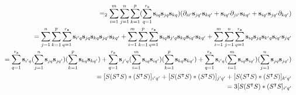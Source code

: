 \documentclass{article}
\begin{document}
\begin{eqnarray*}
    \lefteqn{}
    & & =_2 \sum_{i=1}^m\sum_{j=1}^n\sum_{k=1}^p(\sum_{q=1}^{r_\mathbf{s}}\mathbf{s}_{iq}\mathbf{s}_{jq}\mathbf{s}_{kq})(\partial_{ii'} \mathbf{s}_{jq'}\mathbf{s}_{kq'} + \mathbf{s}_{iq'}\partial_{ji'} \mathbf{s}_{kq'} + \mathbf{s}_{iq'}\mathbf{s}_{jq'}\partial_{kq'}) \\
    & & = \sum_{j=1}^n\sum_{k=1}^p\sum_{q=1}^{r_\mathbf{s}}\mathbf{s}_{i'q}\mathbf{s}_{jq}\mathbf{s}_{kq}\mathbf{s}_{jq'}\mathbf{s}_{kq'} + \sum_{i=1}^m\sum_{k=1}^p\sum_{q=1}^{r_\mathbf{s}}\mathbf{s}_{iq}\mathbf{s}_{j'q}\mathbf{s}_{kq}\mathbf{s}_{iq'}\mathbf{s}_{kq'} + \sum_{i=1}^m\sum_{j=1}^n\sum_{q=1}^{r_\mathbf{s}}\mathbf{s}_{iq}\mathbf{s}_{jq}\mathbf{s}_{k'q}\mathbf{s}_{iq'}\mathbf{s}_{jq'} \\
    & & = \sum_{q=1}^{r_\mathbf{s}}\mathbf{s}_{i'q}(\sum_{j=1}^n \mathbf{s}_{jq}\mathbf{s}_{jq'})(\sum_{k=1}^p \mathbf{s}_{kq}\mathbf{s}_{kq'}) + \sum_{q=1}^{r_\mathbf{s}}\mathbf{s}_{j'q}(\sum_{i=1}^m \mathbf{s}_{iq}\mathbf{s}_{iq'})(\sum_{k=1}^p \mathbf{s}_{kq}\mathbf{s}_{kq'}) + \sum_{q=1}^{r_\mathbf{s}}\mathbf{s}_{i'q}(\sum_{i=1}^m \mathbf{s}_{iq}\mathbf{s}_{iq'})(\sum_{j=1}^n \mathbf{s}_{jq}\mathbf{s}_{jq'}) \\
    & & = [S(S^\intercal S)\ast (S^\intercal S)]_{i'q'} + [S(S^\intercal S)\ast (S^\intercal S)]_{j'q'} + [S(S^\intercal S)\ast (S^\intercal S)]_{k'q'} \\
    & & = 3[S(S^\intercal S)\ast (S^\intercal S]_{i'q'}
\end{eqnarray*}
\end{document}
